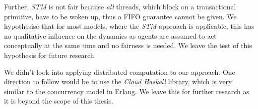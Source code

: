 Further, \textit{STM} is not fair because \textit{all} threads, which block on a transactional primitive, have to be woken up, thus a FIFO guarantee cannot be given. We hypothesise that for most models, where the \textit{STM} approach is applicable, this has no qualitative influence on the dynamics as agents are assumed to act conceptually at the same time and no fairness is needed. We leave the test of this hypothesis for future research.

We didn't look into applying distributed computation to our approach. One direction to follow would be to use the \textit{Cloud Haskell} library, which is very similar to the concurrency model in Erlang. We leave this for further research as it is beyond the scope of this thesis.

